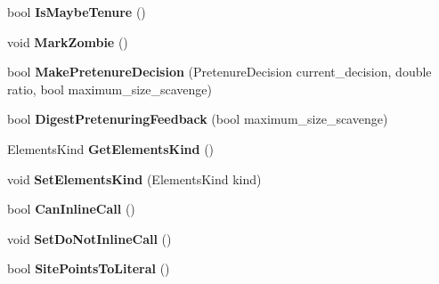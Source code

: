 \begin{DoxyCompactItemize}
\item 
\hypertarget{classv8_1_1internal_1_1_allocation_site_aa1870a70bef3585f613d95509e3c026e}{}bool {\bfseries Is\+Maybe\+Tenure} ()\label{classv8_1_1internal_1_1_allocation_site_aa1870a70bef3585f613d95509e3c026e}

\item 
\hypertarget{classv8_1_1internal_1_1_allocation_site_af432e0790ebdfc00d36c9a6234e98389}{}void {\bfseries Mark\+Zombie} ()\label{classv8_1_1internal_1_1_allocation_site_af432e0790ebdfc00d36c9a6234e98389}

\item 
\hypertarget{classv8_1_1internal_1_1_allocation_site_ac56e44521833202855156f6c8f06101f}{}bool {\bfseries Make\+Pretenure\+Decision} (Pretenure\+Decision current\+\_\+decision, double ratio, bool maximum\+\_\+size\+\_\+scavenge)\label{classv8_1_1internal_1_1_allocation_site_ac56e44521833202855156f6c8f06101f}

\item 
\hypertarget{classv8_1_1internal_1_1_allocation_site_ab06a9db3e9fa8256f8cd97cc5cefeff5}{}bool {\bfseries Digest\+Pretenuring\+Feedback} (bool maximum\+\_\+size\+\_\+scavenge)\label{classv8_1_1internal_1_1_allocation_site_ab06a9db3e9fa8256f8cd97cc5cefeff5}

\item 
\hypertarget{classv8_1_1internal_1_1_allocation_site_ad32f0453a6a51c271b6207227ec2959d}{}Elements\+Kind {\bfseries Get\+Elements\+Kind} ()\label{classv8_1_1internal_1_1_allocation_site_ad32f0453a6a51c271b6207227ec2959d}

\item 
\hypertarget{classv8_1_1internal_1_1_allocation_site_adf1136948311998f7ead14bcf8f2cfd8}{}void {\bfseries Set\+Elements\+Kind} (Elements\+Kind kind)\label{classv8_1_1internal_1_1_allocation_site_adf1136948311998f7ead14bcf8f2cfd8}

\item 
\hypertarget{classv8_1_1internal_1_1_allocation_site_aeb29ad379adc7425340ae3b2e38f72f3}{}bool {\bfseries Can\+Inline\+Call} ()\label{classv8_1_1internal_1_1_allocation_site_aeb29ad379adc7425340ae3b2e38f72f3}

\item 
\hypertarget{classv8_1_1internal_1_1_allocation_site_a3e9fcf250995d87d2c31e05c6e4e6ce5}{}void {\bfseries Set\+Do\+Not\+Inline\+Call} ()\label{classv8_1_1internal_1_1_allocation_site_a3e9fcf250995d87d2c31e05c6e4e6ce5}

\item 
\hypertarget{classv8_1_1internal_1_1_allocation_site_adca3580eb9a8d18cf1becc2b9a1995bb}{}bool {\bfseries Site\+Points\+To\+Literal} ()\label{classv8_1_1internal_1_1_allocation_site_adca3580eb9a8d18cf1becc2b9a1995bb}

\end{DoxyCompactItemize}
